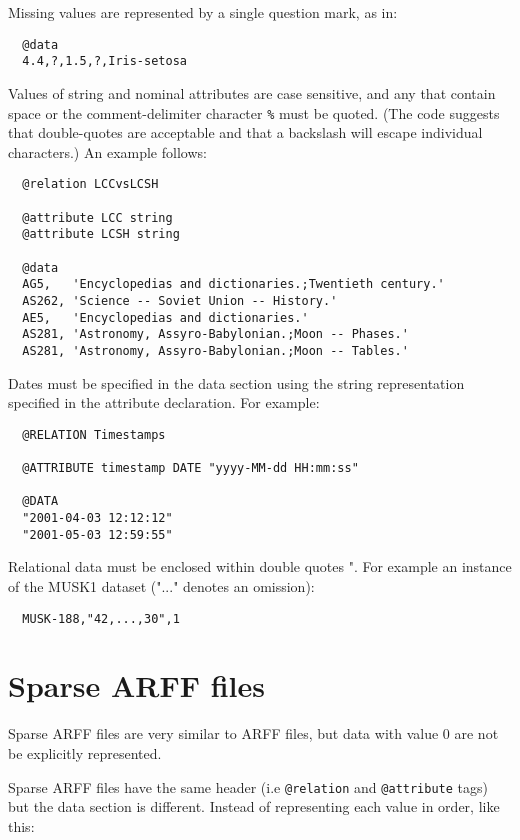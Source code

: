 Missing values are represented by a single question mark, as in:

\begin{verbatim}
  @data
  4.4,?,1.5,?,Iris-setosa
\end{verbatim}

\noindent Values of string and nominal attributes are case sensitive, and any that contain space or the comment-delimiter character \texttt{\%} must be quoted. (The code suggests that double-quotes are acceptable and that a backslash will escape individual characters.) An example follows:

\begin{verbatim}
  @relation LCCvsLCSH

  @attribute LCC string
  @attribute LCSH string

  @data
  AG5,   'Encyclopedias and dictionaries.;Twentieth century.'
  AS262, 'Science -- Soviet Union -- History.'
  AE5,   'Encyclopedias and dictionaries.'
  AS281, 'Astronomy, Assyro-Babylonian.;Moon -- Phases.'
  AS281, 'Astronomy, Assyro-Babylonian.;Moon -- Tables.'
\end{verbatim}

\noindent Dates must be specified in the data section using the string representation specified in the attribute declaration. For example:

\begin{verbatim}
  @RELATION Timestamps

  @ATTRIBUTE timestamp DATE "yyyy-MM-dd HH:mm:ss"

  @DATA
  "2001-04-03 12:12:12"
  "2001-05-03 12:59:55"
\end{verbatim}

\noindent Relational data must be enclosed within double quotes ". For example an instance of the MUSK1 dataset ("..." denotes an omission):

\begin{verbatim}
  MUSK-188,"42,...,30",1
\end{verbatim}


\section{Sparse ARFF files}
Sparse ARFF files are very similar to ARFF files, but data with value 0 are not be explicitly represented.

Sparse ARFF files have the same header (i.e \texttt{@relation} and \texttt{@attribute} tags) but the data section is different. Instead of representing each value in order, like this:

